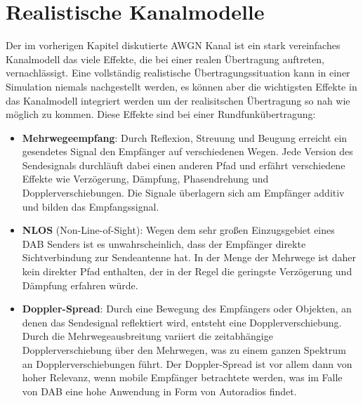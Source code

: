 \section{Realistische Kanalmodelle}
Der im vorherigen Kapitel diskutierte AWGN Kanal ist ein stark vereinfaches Kanalmodell das viele Effekte, die bei einer realen Übertragung auftreten, vernachlässigt. Eine vollständig realistische Übertragungssituation kann in einer Simulation niemals nachgestellt werden, es können aber die wichtigsten Effekte in das Kanalmodell integriert werden um der realisitschen Übertragung so nah wie möglich zu kommen. Diese Effekte sind bei einer Rundfunkübertragung:
\begin{itemize}
\item \textbf{Mehrwegeempfang}: Durch Reflexion, Streuung und Beugung erreicht ein gesendetes Signal den Empfänger auf verschiedenen Wegen. Jede Version des Sendesignals durchläuft dabei einen anderen Pfad und erfährt verschiedene Effekte wie Verzögerung, Dämpfung, Phasendrehung und Dopplerverschiebungen. Die Signale überlagern sich am Empfänger additiv und bilden das Empfangssignal.
\item \textbf{NLOS} (Non-Line-of-Sight): Wegen dem sehr großen Einzugsgebiet eines DAB Senders ist es unwahrscheinlich, dass der Empfänger direkte Sichtverbindung zur Sendeantenne hat. In der Menge der Mehrwege ist daher kein direkter Pfad enthalten, der in der Regel die geringste Verzögerung und Dämpfung erfahren würde.
\item \textbf{Doppler-Spread}: Durch eine Bewegung des Empfängers oder Objekten, an denen das Sendesignal reflektiert wird, entsteht eine Dopplerverschiebung. Durch die Mehrwegeausbreitung variiert die zeitabhängige Dopplerverschiebung über den Mehrwegen, was zu einem ganzen Spektrum an Dopplerverschiebungen führt. Der Doppler-Spread ist vor allem dann von hoher Relevanz, wenn mobile Empfänger betrachtete werden, was im Falle von DAB eine hohe Anwendung in Form von Autoradios findet.
\end{itemize}


